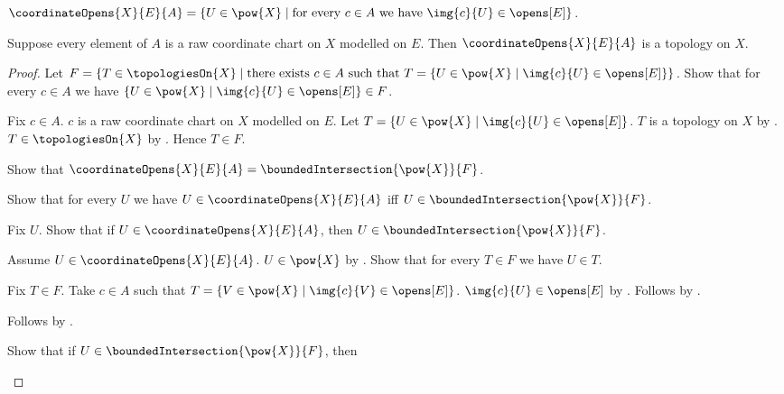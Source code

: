 \begin{definition}\label{coordinate_opens}
    $\coordinateOpens{X}{E}{A}=\{U\in\pow{X}\mid
        \text{for every $c\in A$ we have $\img{c}{U}\in\opens[E]$}\}$.
\end{definition}

\begin{theorem}\label{coordinate_opens_form_topology}
    Suppose every element of $A$ is a raw coordinate chart on $X$ modelled on $E$.
    Then $\coordinateOpens{X}{E}{A}$ is a topology on $X$.
\end{theorem}
\begin{proof}
    Let $F=\{T\in\topologiesOn{X}\mid
        \text{there exists $c\in A$ such that
            $T=\{U\in\pow{X}\mid\img{c}{U}\in\opens[E]\}$}\}$.
    Show that for every $c\in A$ we have
        $\{U\in\pow{X}\mid\img{c}{U}\in\opens[E]\}\in F$.
    \begin{subproof}
        Fix $c\in A$.
        $c$ is a raw coordinate chart on $X$ modelled on $E$.
        Let $T=\{U\in\pow{X}\mid\img{c}{U}\in\opens[E]\}$.
        $T$ is a topology on $X$ by .
        $T\in\topologiesOn{X}$ by .
        Hence $T\in F$.
    \end{subproof}
    Show that $\coordinateOpens{X}{E}{A}=\boundedIntersection{\pow{X}}{F}$.
    \begin{subproof}
        Show that for every $U$ we have $U\in\coordinateOpens{X}{E}{A}$ iff
            $U\in\boundedIntersection{\pow{X}}{F}$.
        \begin{subproof}
            Fix $U$.
            Show that if $U\in\coordinateOpens{X}{E}{A}$, then
                $U\in\boundedIntersection{\pow{X}}{F}$.
            \begin{subproof}
                Assume $U\in\coordinateOpens{X}{E}{A}$.
                $U\in\pow{X}$ by .
                Show that for every $T\in F$ we have $U\in T$.
                \begin{subproof}
                    Fix $T\in F$.
                    Take $c\in A$ such that
                        $T=\{V\in\pow{X}\mid\img{c}{V}\in\opens[E]\}$.
                    $\img{c}{U}\in\opens[E]$ by .
                    Follows by \auto.
                \end{subproof}
                Follows by .
            \end{subproof}
            Show that if $U\in\boundedIntersection{\pow{X}}{F}$, then

\end{subproof}
\end{subproof}
\end{proof}
